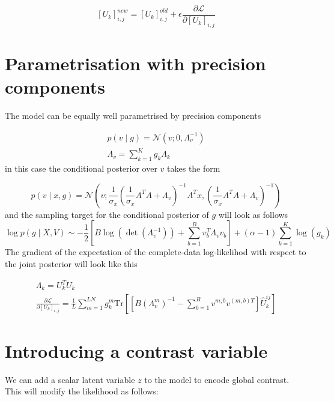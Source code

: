 \documentclass{paper}
\begin{document}
\begin{equation}
\left[ U_k \right]_{i,j}^{new} = \left[ U_k \right]_{i,j}^{old} + \epsilon \frac{\partial \mathcal{L}}{\partial \left[ U_k \right]_{i,j}}
\end{equation}


\section{Parametrisation with precision components}

The model can be equally well parametrised by precision components

\begin{eqnarray}
p(v \mid g) = \mathcal{N}(v; 0,\Lambda_v^{-1}) \\
\Lambda_v = \sum_{k=1}^K g_k \Lambda_k \label{eq:cv}
\end{eqnarray}
%
in this case the conditional posterior over $v$ takes the form

\begin{equation}
p(v \mid x,g) = \mathcal{N}\left(v; \frac{1}{\sigma_x} \left(\frac{1}{\sigma_x} A^T A + \Lambda_v \right)^{-1} A^T x, \left(\frac{1}{\sigma_x} A^T A + \Lambda_v\right)^{-1}\right)
\end{equation}
%
and the sampling target for the conditional posterior of $g$ will look as follows
\begin{equation} 
\log p(g \mid X,V) \sim -\frac{1}{2} \left[B\log(\det(\Lambda_v^{-1})) + \sum_{b=1}^B v_b^T \Lambda_v v_b\right] + (\alpha-1) \sum_{k=1}^K \log(g_k)
\end{equation}
%
The gradient of the expectation of the complete-data log-likelihod with respect to the joint posterior will look like this

\begin{eqnarray}
\Lambda_k = U_k^T U_k \\
\frac{\partial \mathcal{L}}{\partial \left[ U_k \right]_{i,j}} = \frac{1}{L} \sum_{m=1}^{LN} g_k^{m} \textrm{Tr} \left[ \left[ B  \left( \Lambda_v^m \right)^{-1} - \sum_{b=1}^B v^{m,b} v^{(m,b)T} \right] \hat U_k^{ij} \right]
\end{eqnarray}


\section{Introducing a contrast variable}

We can add a scalar latent variable $z$ to the model to encode global contrast. This will modify the likelihood as follows:
\end{document}
